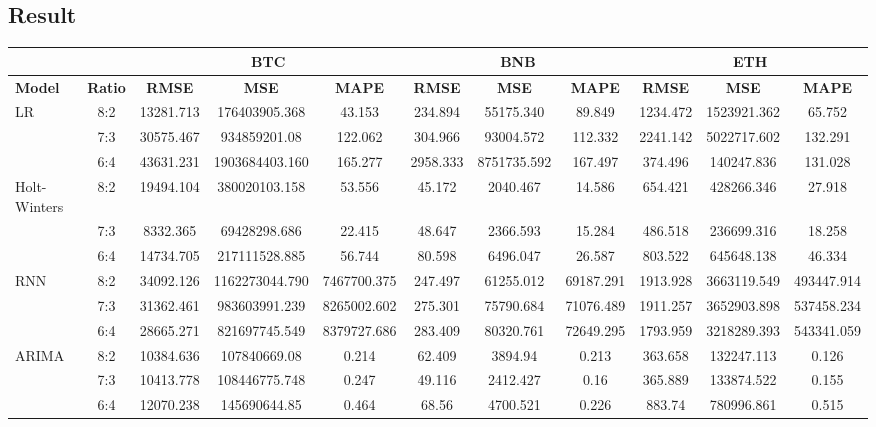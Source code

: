 \documentclass[conference]{IEEEtran}
\begin{document}
\subsection{Result} 
\begin{table}[H]
\centering
\small
\setlength{\tabcolsep}{0.25pt} 
\begin{tabular}{|l|c||c||c||c||c||c||c||c||c||c|}
\hline
& & \multicolumn{3}{c|}{\textbf{BTC}} & \multicolumn{3}{c|}{\textbf{BNB}} & \multicolumn{3}{c|}{\textbf{ETH}} \\
\hline
\textbf{Model} & \textbf{Ratio} & \textbf{RMSE} & \textbf{MSE} & \textbf{MAPE} & \textbf{RMSE} & \textbf{MSE} & \textbf{MAPE} & \textbf{RMSE} & \textbf{MSE} & \textbf{MAPE} \\
\hline
LR   & 8:2 & 13281.713 & 176403905.368 & 43.153 & 234.894 & 55175.340 & 89.849 & 1234.472 &  1523921.362 & 65.752\\
    & 7:3 & 30575.467 & 934859201.08 & 122.062 & 304.966 & 93004.572 & 112.332 & 2241.142  & 5022717.602 & 132.291 \\
    & 6:4 & 43631.231 & 1903684403.160 & 165.277 & 2958.333 & 8751735.592 & 167.497 & 374.496 & 140247.836 & 131.028  \\
\hline
Holt-Winters & 8:2 & 19494.104 & 380020103.158 & 53.556 & 45.172 & 2040.467 & 14.586 & 654.421 & 428266.346 & 27.918 \\
    & 7:3 & 8332.365 & 69428298.686 & 22.415 & 48.647 & 2366.593 & 15.284 & 486.518 & 236699.316 & 18.258  \\
    & 6:4 & 14734.705 & 217111528.885 & 56.744 & 80.598 & 6496.047 & 26.587 & 803.522 & 645648.138 & 46.334 \\
\hline
RNN & 8:2 & 34092.126 & 1162273044.790 & 7467700.375 & 247.497 & 61255.012 & 69187.291 & 1913.928 & 3663119.549 & 493447.914 \\
    & 7:3 & 31362.461 & 983603991.239 & 8265002.602 & 275.301 & 75790.684 & 71076.489 & 1911.257 & 3652903.898 & 537458.234 \\
    & 6:4 & 28665.271 & 821697745.549 & 8379727.686 & 283.409 & 80320.761 & 72649.295 & 1793.959 & 3218289.393 & 543341.059 \\
\hline
ARIMA & 8:2 & 10384.636 & 107840669.08 & 0.214 & 62.409 & 3894.94 & 0.213 & 363.658 & 132247.113 & 0.126 \\
    & 7:3 & 10413.778 & 108446775.748 & 0.247 & 49.116 & 2412.427 & 0.16 & 365.889 & 133874.522 & 0.155 \\
    & 6:4 & 12070.238 & 145690644.85 & 0.464 & 68.56 & 4700.521 & 0.226 & 883.74 & 780996.861 & 0.515 \\

\end{tabular}
\end{table}
\end{document}
